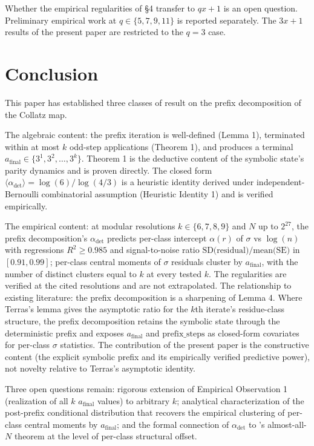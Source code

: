 \documentclass{article}
\theoremstyle{plain}
\begin{document}
Whether the empirical regularities of \S4 transfer to $qx+1$ is an open question. Preliminary empirical work at $q \in \{5, 7, 9, 11\}$ is reported separately. The $3x+1$ results of the present paper are restricted to the $q=3$ case.

\section{Conclusion}
This paper has established three classes of result on the prefix decomposition of the Collatz map.

The algebraic content: the prefix iteration is well-defined (Lemma 1), terminated within at most $k$ odd-step applications (Theorem 1), and produces a terminal $a_{\text{final}} \in \{3^1, 3^2, \ldots, 3^k\}$. Theorem 1 is the deductive content of the symbolic state's parity dynamics and is proven directly. The closed form $\langle \alpha_{\text{det}} \rangle = \log(6)/ \log(4/3)$ is a heuristic identity derived under independent-Bernoulli combinatorial assumption (Heuristic Identity 1) and is verified empirically.

The empirical content: at modular resolutions $k \in \{6, 7, 8, 9\}$ and $N$ up to $2^{27}$, the prefix decomposition's $\alpha_{\text{det}}$ predicts per-class intercept $\alpha(r)$ of $\sigma$ vs $\log(n)$ with regressions $R^2 \geq 0.985$ and signal-to-noise ratio $\text{SD(residual)} / \text{mean(SE)}$ in $[0.91, 0.99]$; per-class central moments of $\sigma$ residuals cluster by $a_{\text{final}}$, with the number of distinct clusters equal to $k$ at every tested $k$. The regularities are verified at the cited resolutions and are not extrapolated. The relationship to existing literature: the prefix decomposition is a sharpening of \citep{terras1976} Lemma 4. Where Terras's lemma gives the asymptotic ratio for the $k$th iterate's residue-class structure, the prefix decomposition retains the symbolic state through the deterministic prefix and exposes $a_{\text{final}}$ and $\text{prefix\_steps}$ as closed-form covariates for per-class $\sigma$ statistics. The contribution of the present paper is the constructive content (the explicit symbolic prefix and its empirically verified predictive power), not novelty relative to Terras's asymptotic identity.

Three open questions remain: rigorous extension of Empirical Observation 1 (realization of all $k$ $a_{\text{final}}$ values) to arbitrary $k$; analytical characterization of the post-prefix conditional distribution that recovers the empirical clustering of per-class central moments by $a_{\text{final}}$; and the formal connection of $\alpha_{\text{det}}$ to \citep{tao2022}'s almost-all-$N$ theorem at the level of per-class structural offset.
\end{document}
